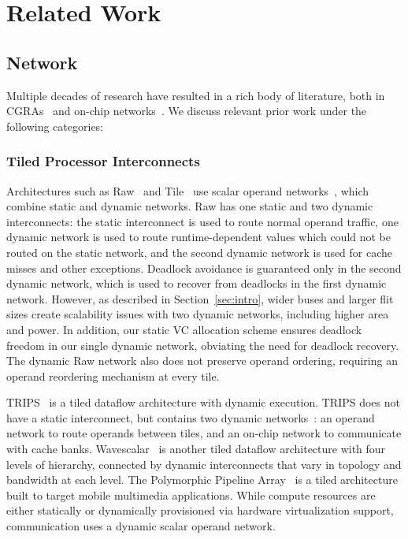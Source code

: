 \chapter{Related Work}

\section{Network}

Multiple decades of research have resulted in a rich body of literature, both in CGRAs~\cite{cgraSurvey1, cgraSurvey2} and on-chip networks~\cite{ocn-synthesis}. We discuss relevant prior work under the following categories:
\subsection{Tiled Processor Interconnects} Architectures such as Raw~\cite{raw} and Tile~\cite{tile} use scalar operand networks~\cite{son}, which combine static and dynamic networks. Raw has one static and two dynamic interconnects: the static interconnect is used to route normal operand traffic, one dynamic network is used to route runtime-dependent values which could not be routed on the static network, and the second dynamic network is used for cache misses and other exceptions. Deadlock avoidance is guaranteed only in the second dynamic network, which is used to recover from deadlocks in the first dynamic network. However, as described in Section~\ref{sec:intro}, wider buses and larger flit sizes create scalability issues with two dynamic networks, including higher area and power. In addition, our static VC allocation scheme ensures deadlock freedom in our single dynamic network, obviating the need for deadlock recovery.
The dynamic Raw network also does not preserve operand ordering, requiring an operand reordering mechanism at every tile.

TRIPS~\cite{trips} is a tiled dataflow architecture with dynamic execution. TRIPS does not have a static interconnect, but contains two dynamic networks~\cite{trips-network}: an operand network  to route operands between tiles, and an on-chip network  to communicate with cache banks. Wavescalar~\cite{wavescalar} is another tiled dataflow architecture with four levels of hierarchy, connected by dynamic interconnects that vary in topology and bandwidth at each level. The Polymorphic Pipeline Array~\cite{ppa} is a tiled architecture built to target mobile multimedia applications. While compute resources are either statically or dynamically provisioned via hardware virtualization support, communication uses a dynamic scalar operand network.

